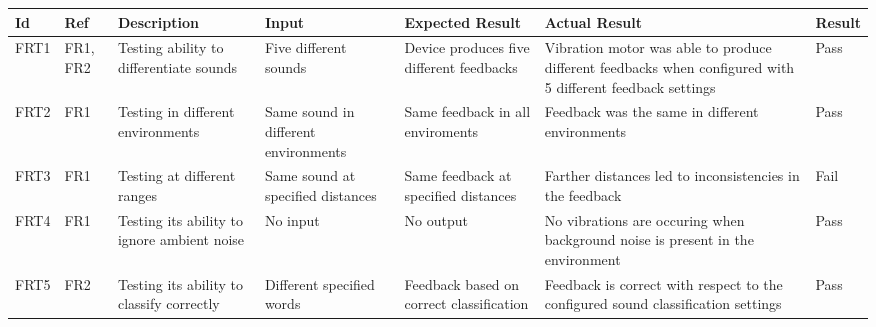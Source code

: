 \documentclass[12pt, titlepage]{article}
\begin{document}
\begin{longtable}{|p{1.4cm}|p{1cm}|p{3cm}|p{1.5cm}|p{2.5cm}|p{2cm}|p{1.2cm}|}

  \endfirsthead
  \endhead
  \hline
  \textbf{Id} & \textbf{Ref} & \textbf{Description}                                                         & \textbf{Input}                                    & \textbf{Expected Result}                                    & \textbf{Actual Result} & \textbf{Result}                                    \\ \hline
  FRT1        & FR1, FR2     & Testing ability to differentiate sounds                                     & Five different sounds                             & Device produces five different feedbacks                    &           Vibration motor was able to produce different feedbacks when configured with 5 different feedback settings              & {\color[HTML]{32CB00} Pass}                        \\ \hline
  FRT2        & FR1          & Testing in different environments                                            & Same sound in different environments              & Same feedback in all enviroments                            &          Feedback was the same in different environments              &         {\color[HTML]{32CB00} Pass}                \\ \hline
  FRT3        & FR1          & Testing at different ranges                                                  & Same sound at specified distances                 & Same feedback at specified distances                        &          Farther distances led to inconsistencies in the feedback              &  {\color[HTML]{FE0000} Fail} \\ \hline
  FRT4        & FR1          & Testing its ability to ignore ambient noise                                  & No input                                          & No output                                                   &          No vibrations are occuring when background noise is present in the environment              &       {\color[HTML]{32CB00} Pass}                                             \\ \hline
  FRT5        & FR2          & Testing its ability to classify correctly                                    & Different specified words                         & Feedback based on correct classification                    &          Feedback is correct with respect to the configured sound classification settings              &                    {\color[HTML]{32CB00} Pass}                               \\ \hline

\end{longtable}
\end{document}
